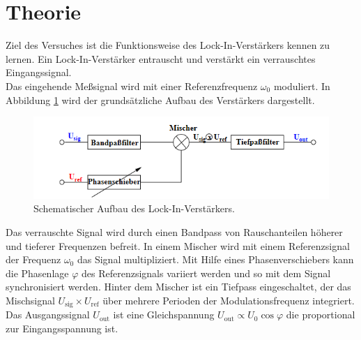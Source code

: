 \section{Theorie}
\label{sec:Theorie}
Ziel des Versuches ist die Funktionsweise des Lock-In-Verstärkers kennen zu lernen.
Ein Lock-In-Verstärker entrauscht und verstärkt ein verrauschtes Eingangssignal.\\
Das eingehende Meßsignal wird mit einer Referenzfrequenz $\omega_0$ moduliert.
In Abbildung \ref{fig:aug} wird der grundsätzliche Aufbau des Verstärkers dargestellt.
\begin{figure}
    \centering
    \caption{Schematischer Aufbau des Lock-In-Verstärkers.\cite{v303}}
    \label{fig:aug}
    \includegraphics[width = 0.6 \textwidth]{pics/gauf.png}
\end{figure}
Das verrauschte Signal wird durch einen Bandpass von Rauschanteilen höherer und tieferer Frequenzen befreit. In einem Mischer
wird mit einem Referenzsignal der Frequenz $\omega_0$ das Signal multipliziert. Mit Hilfe eines Phasenverschiebers kann die Phasenlage $\varphi$
des Referenzsignals variiert werden und so mit dem Signal synchronisiert werden. Hinter dem Mischer ist ein Tiefpass eingeschaltet, der das Mischsignal $U_\text{sig} \times
U_\text{ref}$ über mehrere Perioden der Modulationsfrequenz integriert. Das Ausgangssignal $U_\text{out}$ ist eine Gleichspannung
$U_\text{out} \propto U_0 \cos \varphi $ die proportional zur Eingangsspannung ist.

